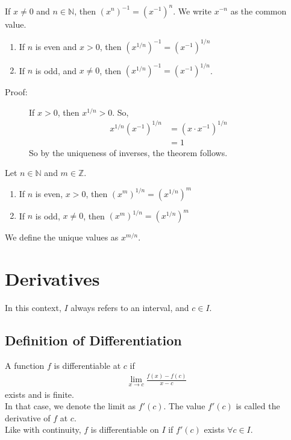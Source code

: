 \documentclass[10pt]{extarticle}
\newcommand{\N}{\mathbb{N}}
\newcommand{\Z}{\mathbb{Z}}
\begin{document}
    If $x\neq 0$ and $n\in\N$, then $\left(x^n\right)^{-1} = (x^{-1})^n$. We write $x^{-n}$ as the common value.
    \begin{enumerate}[(1)]
      \item If $n$ is even and $x > 0$, then $\left(x^{1/n}\right)^{-1} = \left(x^{-1}\right)^{1/n}$ 
      \item If $n$ is odd, and $x\neq 0$, then $\left(x^{1/n}\right)^{-1} = \left(x^{-1}\right)^{1/n}$.
    \end{enumerate}
    \begin{description}
      \item[Proof:] If $x > 0$, then $x^{1/n} > 0$. So,
        \begin{align*}
          x^{1/n} \left(x^{-1}\right)^{1/n} &= (x\cdot x^{-1})^{1/n}\\
                                            &= 1
        \end{align*}
        So by the uniqueness of inverses, the theorem follows.
    \end{description}
    Let $n\in\N$ and $m\in\Z$.
    \begin{enumerate}[(1)]
      \item If $n$ is even, $x > 0$, then $\left(x^m\right)^{1/n}=\left(x^{1/n}\right)^m $
      \item If $n$ is odd, $x\neq 0$, then $\left(x^{m}\right)^{1/n} = \left(x^{1/n}\right)^m$
    \end{enumerate}
    We define the unique values as $x^{m/n}$.
  \section{Derivatives}%
    In this context, $I$ always refers to an interval, and $c\in I$.
  \subsection{Definition of Differentiation}%
    A function $f$ is differentiable at $c$ if
    \begin{align*}
      \lim_{x\rightarrow c}\frac{f(x) - f(c)}{x-c}
    \end{align*}
    exists and is finite.\\

    In that case, we denote the limit as $f'(c)$. The value $f'(c)$ is called the derivative of $f$ at $c$.\\

    Like with continuity, $f$ is differentiable on $I$ if $f'(c)$ exists $\forall c\in I$.
\end{document}
